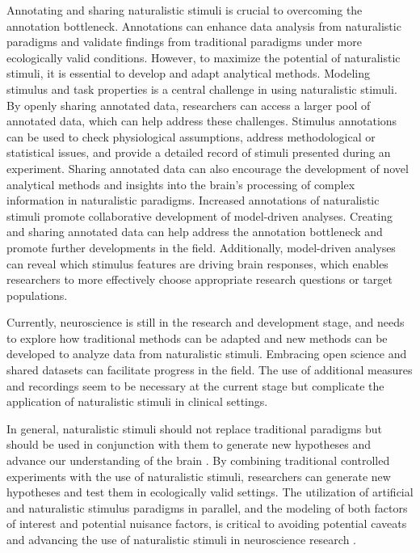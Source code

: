 Annotating and sharing naturalistic stimuli is crucial to overcoming the
annotation bottleneck.
%
Annotations can enhance data analysis from naturalistic paradigms and validate
findings from traditional paradigms under more ecologically valid conditions.
However, to maximize the potential of naturalistic stimuli, it is essential to
develop and adapt analytical methods.
%
Modeling stimulus and task properties is a central challenge in using
naturalistic stimuli.
%
By openly sharing annotated data, researchers can access a larger pool of
annotated data, which can help address these challenges.
%
Stimulus annotations can be used to check physiological assumptions, address
methodological or statistical issues, and provide a detailed record of stimuli
presented during an experiment.
%
Sharing annotated data can also encourage the development of novel analytical
methods and insights into the brain's processing of complex information in
naturalistic paradigms.
%
Increased annotations of naturalistic stimuli promote collaborative development
of model-driven analyses.
%
Creating and sharing annotated data can help address the annotation bottleneck
and promote further developments in the field.
%
Additionally, model-driven analyses can reveal which stimulus features are
driving brain responses, which enables researchers to more effectively choose
appropriate research questions or target populations.



Currently, neuroscience is still in the research and development stage, and
needs to explore how traditional methods can be adapted and new methods can be
developed to analyze data from naturalistic stimuli.
%
Embracing open science and shared datasets can facilitate progress in the field.
%
The use of additional measures and recordings seem to be necessary at the
current stage but complicate the application of naturalistic stimuli in clinical
settings.

%
In general, naturalistic stimuli should not replace traditional paradigms but
should be used in conjunction with them to generate new hypotheses and advance
our understanding of the brain \citep{sonkusare2019naturalistic}.
%
By combining traditional controlled experiments with the use of naturalistic
stimuli, researchers can generate new hypotheses and test them in ecologically
valid settings.
%
The utilization of artificial and naturalistic stimulus paradigms in parallel,
and the modeling of both factors of interest and potential nuisance factors, is
critical to avoiding potential caveats and advancing the use of naturalistic
stimuli in neuroscience research \citep{jaaskelainen2021movies}.

